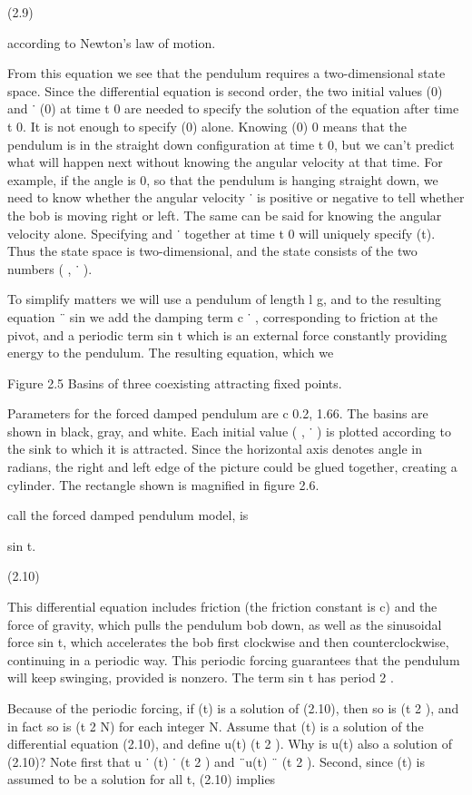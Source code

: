 \documentclass[12pt]{article}
\begin{document}
(2.9)

according to Newton’s law of motion.

From this equation we see that the pendulum requires a two-dimensional state space. Since the differential equation is second order, 
the two initial values (0) and ˙ (0) at time t  0 are needed to specify the solution of the equation after time t  0. It is not 
enough to specify (0) alone. Knowing (0)  0 means that the pendulum is in the straight down conﬁguration at time t  0, but we can’t 
predict what will happen next without knowing the angular velocity at that time. For example, if the angle is 0, so that the pendulum 
is hanging straight down, we need to know whether the angular velocity ˙ is positive or negative to tell whether the bob is moving 
right or left. The 
same can be said for knowing the angular velocity alone. Specifying and ˙ together at time t  0 will uniquely specify (t). Thus the 
state space is two-dimensional, and the state consists of the two numbers ( , ˙ ).

To simplify matters we will use a pendulum of length l  g, and to the resulting equation ¨   sin we add the damping term c ˙ , 
corresponding to friction at the pivot, and a periodic term 
 sin t which is an external force constantly providing energy to the pendulum. The resulting equation, which we

Figure 2.5 Basins of three coexisting attracting ﬁxed points.

Parameters for the forced damped pendulum are c  0.2, 
  1.66. The basins are shown in black, gray, and white. Each initial value ( , ˙ ) is plotted according to the sink to which it is 
attracted. Since the horizontal axis denotes angle in radians, the right and left edge of the picture could be glued together, 
creating a cylinder. The rectangle shown is magniﬁed in ﬁgure 2.6.


call the forced damped pendulum model, is


sin t.

(2.10)

This differential equation includes friction (the friction constant is c) and the force of gravity, which pulls the pendulum bob 
down, as well as the sinusoidal force 
 sin t, which accelerates the bob ﬁrst clockwise and then counterclockwise, continuing in a periodic way. This periodic forcing 
guarantees that the pendulum will keep swinging, provided 
 is nonzero. The term 
 sin t has period 2  .

Because of the periodic forcing, if (t) is a solution of (2.10), then so is (t  2  ), and in fact so is (t  2  N) for each integer N. 
Assume that (t) is a solution of the differential equation (2.10), and deﬁne u(t)  (t  2  ). Why is u(t) also a solution of (2.10)? 
Note ﬁrst that u ˙ (t)  ˙ (t  2  ) and ¨u(t)  ¨ (t  2  ). Second, since (t) is assumed to be a solution for all t, (2.10) implies
\end{document}
